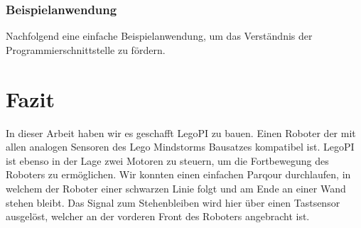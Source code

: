 \subsection{Beispielanwendung}

Nachfolgend eine einfache Beispielanwendung, um das Verständnis der Programmierschnittstelle zu fördern.



\chapter{Fazit}

In dieser Arbeit haben wir es geschafft LegoPI zu bauen. Einen Roboter der mit allen analogen Sensoren des Lego Mindstorms Bausatzes kompatibel ist. LegoPI ist ebenso in der Lage zwei Motoren zu steuern, um die Fortbewegung des Roboters zu ermöglichen. Wir konnten einen einfachen Parqour durchlaufen, in welchem der Roboter einer schwarzen Linie folgt und am Ende an einer Wand stehen bleibt. Das Signal zum Stehenbleiben wird hier über einen Tastsensor ausgelöst, welcher an der vorderen Front des Roboters angebracht ist.
